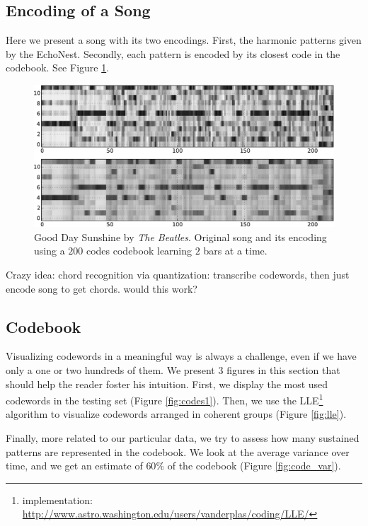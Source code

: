 \documentclass{article}
\begin{document}
\subsection{Encoding of a Song}
Here we present a song with its two encodings. First, the harmonic patterns
given by the EchoNest. Secondly, each pattern is encoded by its closest
code in the codebook. See Figure \ref{fig:encodesong}.

\begin{figure}[htb]
\begin{center}
\includegraphics[width=.9\columnwidth]{song_encoded}
\end{center}
\caption{\small{Good Day Sunshine by \textit{The Beatles}.
Original song and its encoding using a $200$ codes codebook learning
$2$ bars at a time.
}}
\label{fig:encodesong}
\end{figure}

Crazy idea: chord recognition via quantization: transcribe codewords,
then just encode song to get chords. would this work?

\subsection{Codebook}
Visualizing codewords in a meaningful way is always a challenge, 
even if we have only a one or two hundreds of them.
We present $3$ figures in this section that should help the reader
foster his intuition. First, we display the most used codewords in
the testing set (Figure \ref{fig:codes1}). Then, we use the
 LLE\footnote{implementation: 
\url{http://www.astro.washington.edu/users/vanderplas/coding/LLE/}} 
algorithm \cite{Roweis2000} to visualize codewords arranged in
coherent groups (Figure \ref{fig:lle}). 

Finally, more related to our particular data, we try to assess how many
sustained patterns are represented in the codebook. We look at
the average variance over time, and we get an estimate of $60\%$ of the
codebook (Figure \ref{fig:code_var}).
\end{document}
